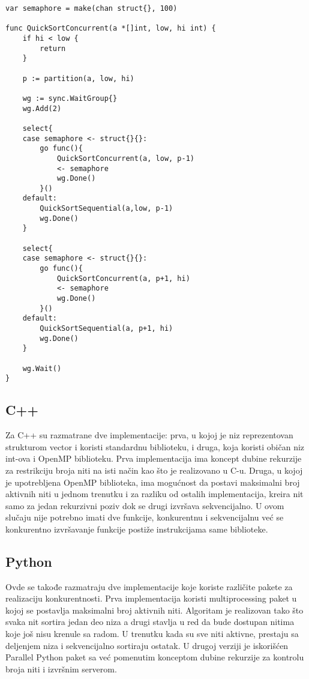 \documentclass[12pt,oneside]{memoir}
\begin{document}
\begin{center}
\begin{lstlisting}[caption=Go implementacija konkurentne quicksort funkcije,label={lst:qs}]
var semaphore = make(chan struct{}, 100)

func QuickSortConcurrent(a *[]int, low, hi int) {
	if hi < low {
		return
	}

	p := partition(a, low, hi)

	wg := sync.WaitGroup{}
	wg.Add(2)

	select{
	case semaphore <- struct{}{}:
		go func(){
			QuickSortConcurrent(a, low, p-1)
			<- semaphore
			wg.Done()
		}()
	default:
		QuickSortSequential(a,low, p-1)
		wg.Done()
	}

	select{
	case semaphore <- struct{}{}:
		go func(){
			QuickSortConcurrent(a, p+1, hi)
			<- semaphore
			wg.Done()
		}()
	default:
		QuickSortSequential(a, p+1, hi)
		wg.Done()
	}

	wg.Wait()
}

\end{lstlisting}
\end{center}


\subsection{C++}
Za C++ su razmatrane dve implementacije: prva\cite{qs_cpp_std}, u kojoj je niz reprezentovan strukturom vector i koristi standardnu biblioteku, i druga\cite{qs_cpp_omp}, koja koristi običan niz int-ova i OpenMP biblioteku. 
Prva implementacija ima koncept dubine rekurzije za restrikciju broja niti na isti način kao što je realizovano u C-u. Druga, u kojoj je upotrebljena OpenMP biblioteka, ima mogućnost da postavi maksimalni broj aktivnih niti u jednom trenutku i za razliku od ostalih implementacija, kreira nit samo za jedan rekurzivni poziv dok se drugi izvršava sekvencijalno. U ovom slučaju nije potrebno imati dve funkcije, konkurentnu i sekvencijalnu već se konkurentno izvršavanje funkcije postiže instrukcijama same biblioteke. 

\subsection{Python}
Ovde se takođe razmatraju dve implementacije koje koriste različite pakete za realizaciju konkurentnosti. Prva implementacija\cite{qs_python_mp} koristi multiprocessing paket u kojoj se postavlja maksimalni broj aktivnih niti. Algoritam je realizovan tako što svaka nit sortira jedan deo niza a drugi stavlja u red da bude dostupan nitima koje još nisu krenule sa radom. U trenutku kada su sve niti aktivne, prestaju sa deljenjem niza i sekvencijalno sortiraju ostatak. U drugoj verziji\cite{qs_python_pp} je iskorišćen Parallel Python paket sa već pomenutim konceptom dubine rekurzije za kontrolu broja niti i izvršnim serverom. 
\end{document}
